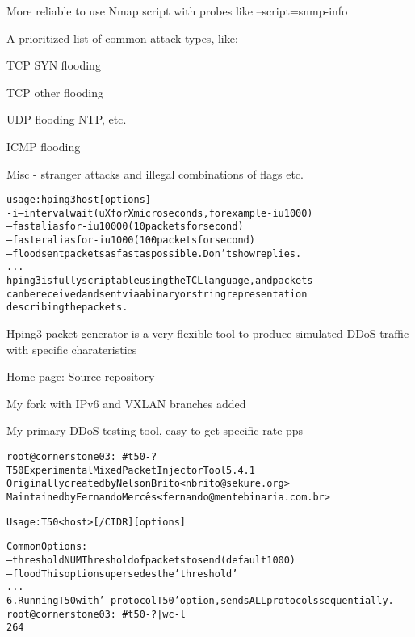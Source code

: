 \documentclass[Screen16to9,17pt]{foils}
\begin{document}
\vskip 5mm
\centerline{More reliable to use Nmap script with probes like --script=snmp-info}


A prioritized list of common attack types, like:

\begin{list2}
\item TCP SYN flooding
\item TCP other flooding
\item UDP flooding NTP, etc.
\item ICMP flooding
\item Misc - stranger attacks and illegal combinations of flags etc.
\end{list2}


\begin{alltt}\footnotesize
usage: hping3 host [options]
  -i  --interval  wait (uX for X microseconds, for example -i u1000)
      --fast      alias for -i u10000 (10 packets for second)
      --faster    alias for -i u1000 (100 packets for second)
      --flood      sent packets as fast as possible. Don't show replies.
...
hping3 is fully scriptable using the TCL language, and packets
can be received and sent via a binary or string representation
describing the packets.
\end{alltt}

\begin{list2}
\item Hping3 packet generator is a very flexible tool to produce simulated DDoS traffic with specific charateristics
\item Home page:  Source repository 
\item My fork with IPv6 and VXLAN branches added 
\end{list2}

\centerline{My primary DDoS testing tool, easy to get specific rate pps}



\begin{alltt}\footnotesize
root@cornerstone03:~# t50 -?
T50 Experimental Mixed Packet Injector Tool 5.4.1
Originally created by Nelson Brito <nbrito@sekure.org>
Maintained by Fernando Mercês <fernando@mentebinaria.com.br>

Usage: T50 <host> [/CIDR] [options]

Common Options:
    --threshold NUM        Threshold of packets to send     (default 1000)
    --flood                This option supersedes the 'threshold'
...
6. Running T50 with '--protocol T50' option, sends ALL protocols sequentially.
root@cornerstone03:~# t50 -? | wc -l
264
\end{alltt}
\end{document}
